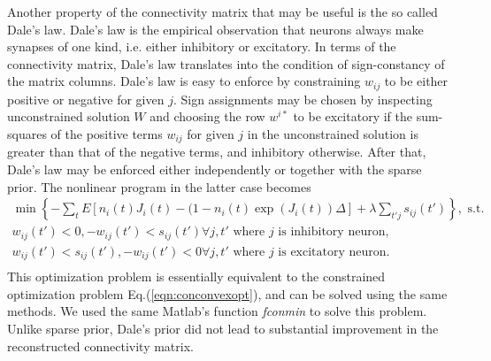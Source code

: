 \documentclass[amsmath,amssymb]{revtex4}
\begin{document}
Another property of the connectivity matrix that may be useful is the so called Dale's law. Dale's law is the empirical observation that neurons always make synapses of one kind, i.e. either inhibitory or excitatory. In terms of the connectivity matrix, Dale's law translates into the condition of sign-constancy of the matrix columns. Dale's law is easy to enforce by constraining $w_{ij}$ to be either positive or negative for given $j$.
Sign assignments may be chosen by inspecting unconstrained solution $W$ and choosing the row $w^{i*}$ to be excitatory if the sum-squares of the positive terms $w_{ij}$ for given $j$ in the unconstrained solution is greater than that of the negative terms, and inhibitory otherwise.
After that, Dale's law may be enforced either independently or together with the sparse prior.
The nonlinear program in the latter case becomes
\begin{equation}
\begin{array}{l}
\min \left\{-\sum\limits_t E\left[ n_i(t) J_i(t) - (1-n_i(t) \exp(J_i(t)) \Delta \right]+\lambda \sum\limits_{t'j}s_{ij}(t')\right\}, \text{ s.t. }\\
w_{ij}(t')<0, -w_{ij}(t')<s_{ij}(t') \forall j,t'\text{ where }j\text{ is inhibitory neuron},\\
w_{ij}(t')<s_{ij}(t'), -w_{ij}(t')<0 \forall j,t'\text{ where }j\text{ is excitatory neuron}. \\
\end{array}
\end{equation}
This optimization problem is essentially equivalent to the constrained optimization problem Eq.(\ref{eqn:conconvexopt}), and can be solved using the same methods. We used the same Matlab's function {\em fconmin} to solve this problem. Unlike sparse prior, Dale's prior did not lead to substantial improvement in the reconstructed connectivity matrix.
\end{document}
